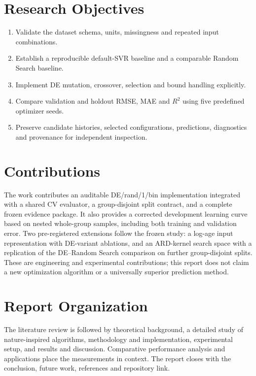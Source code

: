 \section{Research Objectives}
\begin{enumerate}
\item Validate the dataset schema, units, missingness and repeated input combinations.
\item Establish a reproducible default-SVR baseline and a comparable Random Search baseline.
\item Implement DE mutation, crossover, selection and bound handling explicitly.
\item Compare validation and holdout RMSE, MAE and $R^2$ using five predefined optimizer seeds.
\item Preserve candidate histories, selected configurations, predictions, diagnostics and provenance for independent inspection.
\end{enumerate}
\section{Contributions}
The work contributes an auditable DE/rand/1/bin implementation integrated with a shared CV evaluator, a group-disjoint split contract, and a complete frozen evidence package. It also provides a corrected development learning curve based on nested whole-group samples, including both training and validation error. Two pre-registered extensions follow the frozen study: a log-age input representation with DE-variant ablations, and an ARD-kernel search space with a replication of the DE--Random Search comparison on further group-disjoint splits. These are engineering and experimental contributions; this report does not claim a new optimization algorithm or a universally superior prediction method.
\section{Report Organization}
The literature review is followed by theoretical background, a detailed study of nature-inspired algorithms, methodology and implementation, experimental setup, and results and discussion. Comparative performance analysis and applications place the measurements in context. The report closes with the conclusion, future work, references and repository link.
